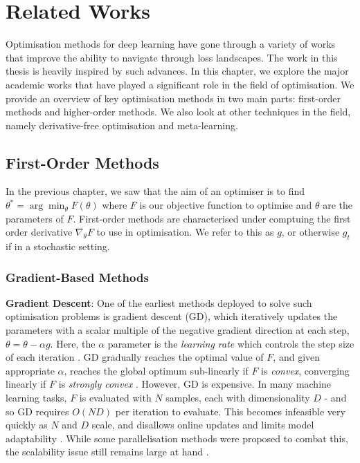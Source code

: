 \chapter{Related Works}
\label{chap:lit_review}


Optimisation methods for deep learning have gone through a variety of works that improve the ability to navigate through loss landscapes.
The work in this thesis is heavily inspired by such advances. In this chapter, we explore the major academic works that have played a significant role in the field of optimisation. We provide an overview of key optimisation methods in two main parts: first-order methods and higher-order methods. We also look at other techniques in the field, namely derivative-free optimisation and meta-learning.

\section{First-Order Methods}
In the previous chapter, we saw that the aim of an optimiser is to find $\theta^* = \arg\min_{\theta} F(\theta)$ where $F$ is our objective function to optimise and $\theta$ are the parameters of $F$. First-order methods are characterised under comptuing the first order derivative $\nabla_{\theta}F$ to use in optimisation. We refer to this as $g$, or otherwise $g_t$ if in a stochastic setting.

\subsection{Gradient-Based Methods}
\textbf{Gradient Descent}: One of the earliest methods deployed to solve such optimisation problems is gradient descent (GD), which iteratively updates the parameters with a scalar multiple of the negative gradient direction at each step, $\theta = \theta - \alpha g$. Here, the $\alpha$ parameter is the \textit{learning rate} which controls the step size of each iteration \citep{ruder2016overview}. GD gradually reaches the optimal value of $F$, and given appropriate $\alpha$, reaches the global optimum sub-linearly if $F$ is \textit{convex}, converging linearly if $F$ is \textit{strongly convex} \citep{NoceWrig06}. However, GD is expensive. In many machine learning tasks, $F$ is evaluated with $N$ samples, each with dimensionality $D$ - and so GD requires $O(ND)$ per iteration to evaluate. This becomes infeasible very quickly as $N$ and $D$ scale, and disallows online updates and limits model adaptability \citep{ruder2016overview}. While some parallelisation methods were proposed to combat this, the scalability issue still remains large at hand \citep{alspector1992parallel,NoceWrig06}.

